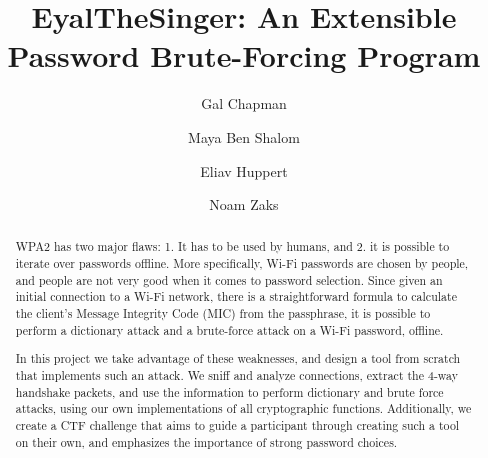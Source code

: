 \documentclass[sigconf]{acmart}
\begin{document}
\title{EyalTheSinger: An Extensible Password Brute-Forcing Program}

\author{Gal Chapman}

\author{Maya Ben Shalom}

\author{Eliav Huppert}

\author{Noam Zaks}


\begin{abstract}
    WPA2 has two major flaws: 1. It has to be used by humans, and 2. it is possible to iterate over passwords offline. More specifically, Wi-Fi passwords are chosen by people, and people are not very good when it comes to password selection. Since given an initial connection to a Wi-Fi network, there is a straightforward formula to calculate the client's Message Integrity Code (MIC) from the passphrase, it is possible to perform a dictionary attack and a brute-force attack on a Wi-Fi password, offline.

    In this project we take advantage of these weaknesses, and design a tool from scratch that implements such an attack. We sniff and analyze connections, extract the 4-way handshake packets, and use the information to perform dictionary and brute force attacks, using our own implementations of all cryptographic functions. Additionally, we create a CTF challenge that aims to guide a participant through creating such a tool on their own, and emphasizes the importance of strong password choices.

\end{abstract}
\end{document}
